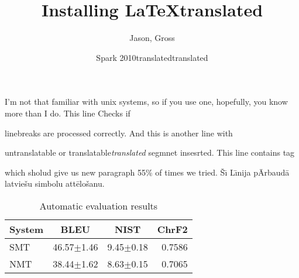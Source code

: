 \documentclass{article}
\begin{document}
\title{Installing \LaTeX}
\author{Jason, Gross}
\date{Spark 2010}
I'm not that familiar with unix systems, so if you use one, hopefully, you know more than I do. This line 
Checks if \date{translated} linebreaks are processed correctly. 
And this is another line with \date{translated} untranslatable or translatable\emph{translated} segmnet insesrted. This line contains tag \title{translated} which sholud give us new paragraph 55\% of times we tried. 
\v{S}\={\i} L\={\i}nija p\={A}rbaud\={a} latvie\v{s}u simbolu att\={e}lo\v{s}anu.
\begin{table}[]
\centering
\begin{tabular}{|lrrr|}
\hline
\multicolumn{1}{|c}{\textbf{System}} & \multicolumn{1}{c}{\textbf{BLEU}} & \multicolumn{1}{c}{\textbf{NIST}} & \multicolumn{1}{c|}{\textbf{ChrF2}} \\ \hline
SMT & 46.57$\pm$1.46 & 9.45$\pm$0.18 & 0.7586 \\
NMT & 38.44$\pm$1.62 & 8.63$\pm$0.15 & 0.7065 \\ \hline
\end{tabular}
\caption{Automatic evaluation results}
\label{mt-eval-table}
\end{table}
\end{document}
